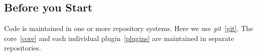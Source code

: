 \subsection{Before you Start}
\label{givens}

Code is maintained in one or more repository systems. Here we use \emph{git}~\ref{git}. The core~\ref{core} and each individual plugin~\ref{plugins} are maintained in separate repositories. 